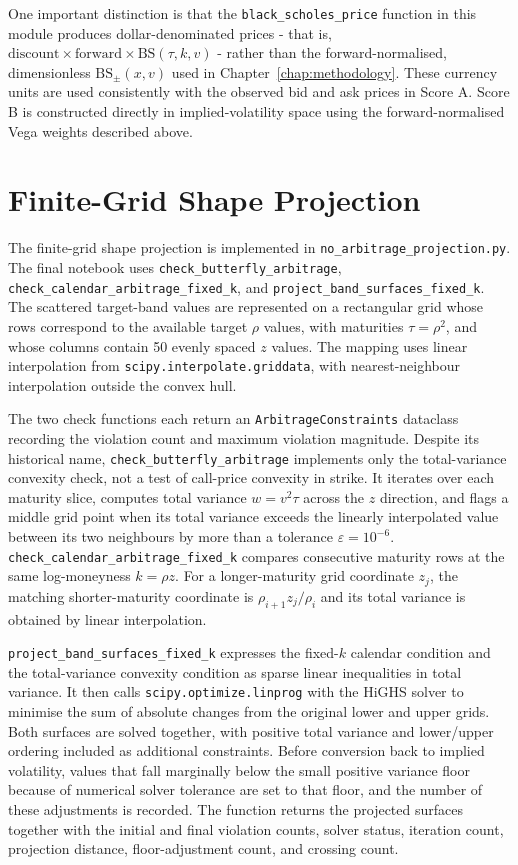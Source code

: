 One important distinction is that the \texttt{black\_scholes\_price} function in this module produces dollar-denominated prices - that is, $\text{discount} \times \text{forward} \times \text{BS}(\tau, k, v)$ - rather than the forward-normalised, dimensionless $\text{BS}_\pm(x, v)$ used in Chapter~\ref{chap:methodology}. These currency units are used consistently with the observed bid and ask prices in Score A. Score B is constructed directly in implied-volatility space using the forward-normalised Vega weights described above.

\section{Finite-Grid Shape Projection}
\label{sec:impl_projection}

The finite-grid shape projection is implemented in \texttt{no\_arbitrage\_projection.py}. The final notebook uses \texttt{check\_butterfly\_arbitrage}, \texttt{check\_calendar\_arbitrage\_fixed\_k}, and \texttt{project\_band\_surfaces\_fixed\_k}. The scattered target-band values are represented on a rectangular grid whose rows correspond to the available target $\rho$ values, with maturities $\tau=\rho^2$, and whose columns contain 50 evenly spaced $z$ values. The mapping uses linear interpolation from \texttt{scipy.interpolate.griddata}, with nearest-neighbour interpolation outside the convex hull.

The two check functions each return an \texttt{ArbitrageConstraints} dataclass recording the violation count and maximum violation magnitude. Despite its historical name, \texttt{check\_butterfly\_arbitrage} implements only the total-variance convexity check, not a test of call-price convexity in strike. It iterates over each maturity slice, computes total variance $w=v^2\tau$ across the $z$ direction, and flags a middle grid point when its total variance exceeds the linearly interpolated value between its two neighbours by more than a tolerance $\varepsilon=10^{-6}$. \texttt{check\_calendar\_arbitrage\_fixed\_k} compares consecutive maturity rows at the same log-moneyness $k=\rho z$. For a longer-maturity grid coordinate $z_j$, the matching shorter-maturity coordinate is $\rho_{i+1}z_j/\rho_i$ and its total variance is obtained by linear interpolation.

\texttt{project\_band\_surfaces\_fixed\_k} expresses the fixed-$k$ calendar condition and the total-variance convexity condition as sparse linear inequalities in total variance. It then calls \texttt{scipy.optimize.linprog} with the HiGHS solver to minimise the sum of absolute changes from the original lower and upper grids. Both surfaces are solved together, with positive total variance and lower/upper ordering included as additional constraints. Before conversion back to implied volatility, values that fall marginally below the small positive variance floor because of numerical solver tolerance are set to that floor, and the number of these adjustments is recorded. The function returns the projected surfaces together with the initial and final violation counts, solver status, iteration count, projection distance, floor-adjustment count, and crossing count.

